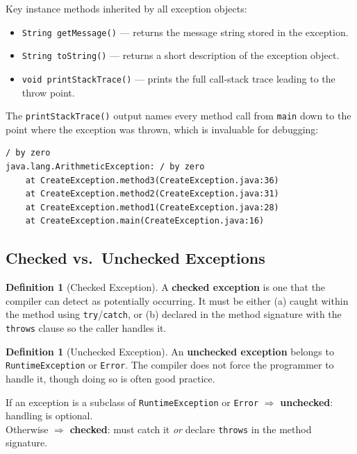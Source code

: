 \documentclass[11pt, a4paper, notitlepage]{report}
\theoremstyle{definition}
\newtheorem{definition}[theorem]{Definition}
\theoremstyle{remark}
\theoremstyle{definition}
\begin{document}
Key instance methods inherited by all exception objects:
\begin{itemize}
  \item \texttt{String getMessage()} --- returns the message string stored in the exception.
  \item \texttt{String toString()} --- returns a short description of the exception object.
  \item \texttt{void printStackTrace()} --- prints the full call-stack trace leading to the throw point.
\end{itemize}

The \texttt{printStackTrace()} output names every method call from \texttt{main} down to the point where the exception was thrown, which is invaluable for debugging:

\begin{lstlisting}
/ by zero
java.lang.ArithmeticException: / by zero
    at CreateException.method3(CreateException.java:36)
    at CreateException.method2(CreateException.java:31)
    at CreateException.method1(CreateException.java:28)
    at CreateException.main(CreateException.java:16)
\end{lstlisting}

\subsection{Checked vs.\ Unchecked Exceptions}
\label{sec:ch4-checked-unchecked}

\begin{definition}[Checked Exception]
\label{def:ch4-checked}
A \textbf{checked exception} is one that the compiler can detect as potentially occurring. It must be either (a) caught within the method using \texttt{try}/\texttt{catch}, or (b) declared in the method signature with the \texttt{throws} clause so the caller handles it.
\end{definition}

\begin{definition}[Unchecked Exception]
\label{def:ch4-unchecked}
An \textbf{unchecked exception} belongs to \texttt{RuntimeException} or \texttt{Error}. The compiler does not force the programmer to handle it, though doing so is often good practice.
\end{definition}

\begin{keyresult}[title={Key Result: Checked vs.\ Unchecked Rule}]
If an exception is a subclass of \texttt{RuntimeException} or \texttt{Error} $\Rightarrow$ \textbf{unchecked}: handling is optional.\\
Otherwise $\Rightarrow$ \textbf{checked}: must catch it \emph{or} declare \texttt{throws} in the method signature.
\end{keyresult}
\end{document}

